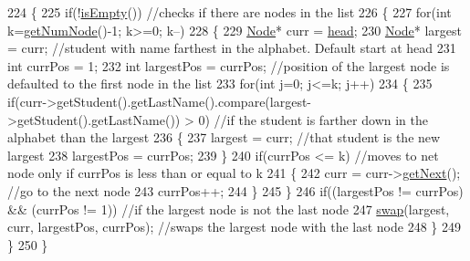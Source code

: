 \begin{DoxyCode}
224 \{
225    \textcolor{keywordflow}{if}(!\hyperlink{classLinkedList_a1b28b1e19e5aa68f3d89352e307928f6}{isEmpty}()) \textcolor{comment}{//checks if there are nodes in the list                                           
                                                                                                              }
226    \{
227       \textcolor{keywordflow}{for}(\textcolor{keywordtype}{int} k=\hyperlink{classLinkedList_ae04dbbcae32f8fb03dce3e174854981f}{getNumNode}()-1; k>=0; k--)
228       \{
229          \hyperlink{classNode}{Node}* curr = \hyperlink{classLinkedList_a35e09287e2d2943707b011208e7a8ed2}{head};
230          \hyperlink{classNode}{Node}* largest = curr; \textcolor{comment}{//student with name farthest in the alphabet. Default start at head     
                                                                                                           }
231          \textcolor{keywordtype}{int} currPos = 1;
232          \textcolor{keywordtype}{int} largestPos = currPos; \textcolor{comment}{//position of the largest node is defaulted to the first node in the
       list                                                                                                }
233          \textcolor{keywordflow}{for}(\textcolor{keywordtype}{int} j=0; j<=k; j++)
234          \{
235             \textcolor{keywordflow}{if}(curr->getStudent().getLastName().compare(largest->getStudent().getLastName()) > 0) \textcolor{comment}{//if the
       student is farther down in the alphabet than the largest                                         }
236             \{
237                largest = curr; \textcolor{comment}{//that student is the new largest                                           
                                                                                                       }
238                largestPos = currPos;
239             \}
240             \textcolor{keywordflow}{if}(currPos <= k) \textcolor{comment}{//moves to net node only if currPos is less than or equal to k                
                                                                                                       }
241             \{
242                curr = curr->\hyperlink{classNode_af8f2d178f274dd254e6e1965971f0fd0}{getNext}(); \textcolor{comment}{//go to the next node                                        
                                                                                                              }
243                currPos++;
244             \}
245          \}
246          \textcolor{keywordflow}{if}((largestPos != currPos) && (currPos != 1)) \textcolor{comment}{//if the largest node is not the last node          
                                                                                                       }
247             \hyperlink{classLinkedList_adea39e4b5d8f3fcb608c11f7746790ed}{swap}(largest, curr, largestPos, currPos); \textcolor{comment}{//swaps the largest node with the last node      
                                                                                                           }
248       \}
249    \}
250 \}
\end{DoxyCode}


